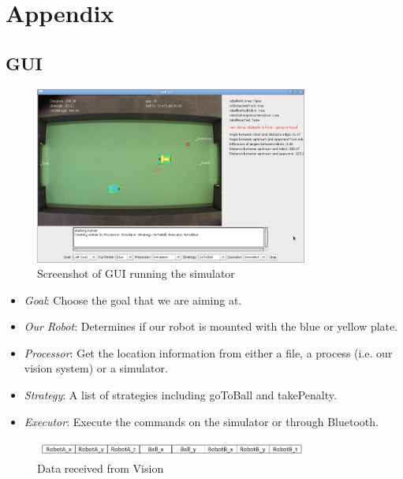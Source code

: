 \documentclass[conference,12pt]{IEEEtran}
\begin{document}
\newpage

\section{Appendix}

\subsection{GUI}
\begin{figure}[htp]
\begin{center}
\leavevmode
\includegraphics[width=0.8\textwidth] {GUI.png}
\end{center}
\label{fig:GUI}
\caption{Screenshot of GUI running the simulator}
\end{figure}
\begin{itemize}
 \item \textit{Goal}: Choose the goal that we are aiming at.
 \item \textit{Our Robot}: Determines if our robot is mounted with the blue or yellow plate.
 \item \textit{Processor}: Get the location information from either a file, a process (i.e. our vision system) or a simulator.
 \item \textit{Strategy}: A list of strategies including goToBall and takePenalty.
 \item \textit{Executor}: Execute the commands on the simulator or through Bluetooth.
\end{itemize}

\begin{figure}[htp]
\begin{center}
\leavevmode
\includegraphics[width=0.8\textwidth] {vision.jpeg}
\end{center}
\caption{Data received from Vision}
\label{fig:visiondata}
\end{figure}
\end{document}

